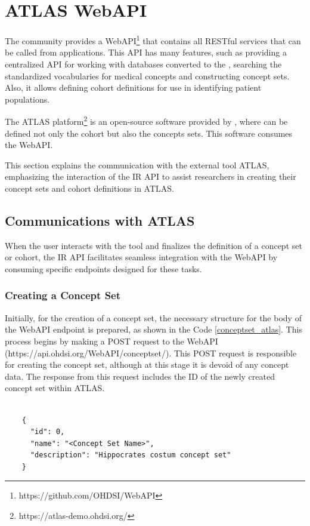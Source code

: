 \section{ATLAS WebAPI}

The {\ohdsi} community provides a WebAPI\footnote{https://github.com/OHDSI/WebAPI} that contains all {\ohdsi} RESTful services that can be called from {\ohdsi} applications. This API has many features, such as providing a centralized API for working with databases converted to the {\omop}, searching the {\omop} standardized vocabularies for medical concepts and constructing concept sets. Also, it allows defining cohort definitions for use in identifying patient populations.

The ATLAS platform\footnote{https://atlas-demo.ohdsi.org/} is an open-source software provided by {\ohdsi}, where can be defined not only the cohort but also the concepts sets. This software consumes the {\ohdsi} WebAPI.

This section explains the communication with the external tool ATLAS, emphasizing the interaction of the IR API to assist researchers in creating their concept sets and cohort definitions in ATLAS.



\subsection{Communications with ATLAS}

When the user interacts with the tool and finalizes the definition of a concept set or cohort, the IR API facilitates seamless integration with the {\ohdsi} WebAPI by consuming specific endpoints designed for these tasks.

\subsubsection{Creating a Concept Set}

Initially, for the creation of a concept set, the necessary structure for the body of the {\ohdsi} WebAPI endpoint is prepared, as shown in the Code \ref{conceptset_atlas}. This process begins by making a POST request to the {\ohdsi} WebAPI (https://api.ohdsi.org/WebAPI/conceptset/). This POST request is responsible for creating the concept set, although at this stage it is devoid of any concept data. The response from this request includes the ID of the newly created concept set within ATLAS.

\begin{listing}[H]
  \begin{verbatim}
      
    { 
      "id": 0, 
      "name": "<Concept Set Name>", 
      "description": "Hippocrates costum concept set"
    }

  \end{verbatim}
  \caption{The body to create the Concept Set in ATLAS.}
  \label{conceptset_atlas}
\end{listing}


